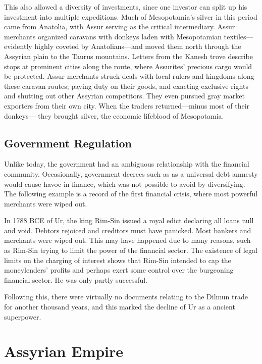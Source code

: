 \documentclass{article}
\begin{document}
    This also allowed a diversity of investments, since one investor can split up his investment into multiple expeditions. Much of Mesopotamia’s silver in this period came from Anatolia, with Assur serving as the critical intermediary. Assur merchants organized caravans with donkeys laden with Mesopotamian textiles—evidently highly coveted by Anatolians—and moved them north through the Assyrian plain to the Taurus mountains. Letters from the Kanesh trove describe stops at prominent cities along the route, where Assurites’ precious cargo would be protected. Assur merchants struck deals with local rulers and kingdoms along these caravan routes; paying duty on their goods, and exacting exclusive rights and shutting out other Assyrian competitors. They even pursued gray market exporters from their own city. When the traders returned—minus most of their donkeys— they brought silver, the economic lifeblood of Mesopotamia.

  \subsection{Government Regulation}

    Unlike today, the government had an ambiguous relationship with the financial community. Occasionally, government decrees such as as a universal debt amnesty would cause havoc in finance, which was not possible to avoid by diversifying. The following example is a record of the first financial crisis, where most powerful merchants were wiped out. 

    \begin{example}
      In 1788 BCE of Ur, the king Rim-Sin issued a royal edict declaring all loans null and void. Debtors rejoiced and creditors must have panicked. Most bankers and merchants were wiped out. This may have happened due to many reasons, such as Rim-Sin trying to limit the power of the financial sector. The existence of legal limits on the charging of interest shows that Rim-Sin intended to cap the moneylenders’ profits and perhaps exert some control over the burgeoning financial sector. He was only partly successful.

      Following this, there were virtually no documents relating to the Dilmun trade for another thousand years, and this marked the decline of Ur as a ancient superpower. 
    \end{example}

\section{Assyrian Empire}
\end{document}
